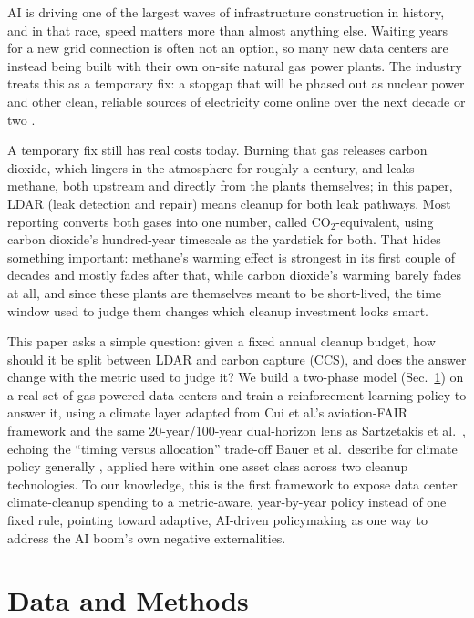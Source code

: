 \documentclass{article}
\begin{document}
AI is driving one of the largest waves of infrastructure construction in
history, and in that race, speed matters more than almost anything else.
Waiting years for a new grid connection is often not an option, so many
new data centers are instead being built with their own on-site natural
gas power plants. The industry treats this as a temporary fix: a stopgap
that will be phased out as nuclear power and other clean, reliable
sources of electricity come online over the next decade or two
\cite{eip2026powerbehindai}.

A temporary fix still has real costs today. Burning that gas releases
carbon dioxide, which lingers in the atmosphere for roughly a century,
and leaks methane, both upstream and directly from the plants
themselves; in this paper, LDAR (leak detection and repair) means
cleanup for both leak pathways. Most reporting converts both gases into
one number, called CO$_2$-equivalent, using carbon dioxide's
hundred-year timescale as the yardstick for both. That hides something
important: methane's warming effect is strongest in its first couple of
decades and mostly fades after that, while carbon dioxide's warming
barely fades at all, and since these plants are themselves meant to be
short-lived, the time window used to judge them changes which cleanup
investment looks smart.

This paper asks a simple question: given a fixed annual cleanup budget,
how should it be split between LDAR and carbon capture (CCS), and does
the answer change with the metric used to judge it? We build a
two-phase model (Sec.~\ref{sec:methods}) on a real set of gas-powered
data centers and train a reinforcement learning policy to answer it,
using a climate layer adapted from Cui et al.'s aviation-FAIR framework
\cite{cui2024aviationfair,millar2017fair,smith2018fair,joos2013carbon}
and the same 20-year/100-year dual-horizon lens as Sartzetakis et al.\
\cite{sartzetakis2025temporaltradeoffs}, echoing the ``timing versus
allocation'' trade-off Bauer et al.\ describe for climate policy
generally \cite{bauer2024timing}, applied here within one asset class
across two cleanup technologies. To our knowledge, this is the first
framework to expose data center climate-cleanup spending to a
metric-aware, year-by-year policy instead of one fixed rule, pointing
toward adaptive, AI-driven policymaking as one way to address the AI
boom's own negative externalities.

\section{Data and Methods}
\label{sec:methods}
\end{document}
